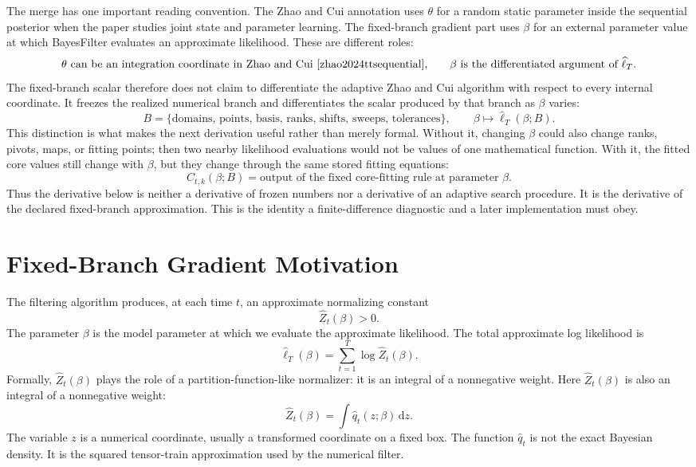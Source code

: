 \documentclass[11pt]{article}
\newcommand{\dd}{\,\mathrm d}
\newcommand{\widehatell}{\widehat\ell}
\begin{document}
The merge has one important reading convention.  The Zhao and Cui \cite{zhao2024ttsequential} annotation uses
\(\theta\) for a random static parameter inside the sequential posterior when
the paper studies joint state and parameter learning.  The fixed-branch
gradient part uses \(\beta\) for an external parameter value at which
BayesFilter evaluates an approximate likelihood.  These are different roles:
\[
    \theta \text{ can be an integration coordinate in Zhao and Cui \cite{zhao2024ttsequential},}
    \qquad
    \beta \text{ is the differentiated argument of } \widehat\ell_T .
    \label{eq:p24-p20-b1}
\]
The fixed-branch scalar therefore does not claim to differentiate the adaptive
Zhao and Cui \cite{zhao2024ttsequential} algorithm with respect to every internal coordinate.  It freezes the
realized numerical branch and differentiates the scalar produced by that
branch as \(\beta\) varies:
\[
    B=\{\text{domains, points, basis, ranks, shifts, sweeps, tolerances}\},
    \qquad
    \beta\mapsto \widehat\ell_T(\beta;B).
    \label{eq:p24-p20-b2}
\]
This distinction is what makes the next derivation useful rather than merely
formal.  Without it, changing \(\beta\) could also change ranks, pivots, maps,
or fitting points; then two nearby likelihood evaluations would not be values
of one mathematical function.  With it, the fitted core values still change
with \(\beta\), but they change through the same stored fitting equations:
\[
    C_{t,k}(\beta;B)
    =
    \text{output of the fixed core-fitting rule at parameter }\beta.
    \label{eq:p24-p20-b3}
\]
Thus the derivative below is neither a derivative of frozen numbers nor a
derivative of an adaptive search procedure.  It is the derivative of the
declared fixed-branch approximation.  This is the identity a finite-difference
diagnostic and a later implementation must obey.

\section{Fixed-Branch Gradient Motivation}

The filtering algorithm produces, at each time \(t\), an approximate
normalizing constant
\[
    \widehat Z_t(\beta)>0.
    \label{eq:p24-p19-1}
\]
The parameter \(\beta\) is the model parameter at which we evaluate the
approximate likelihood.  The total approximate log likelihood is
\[
    \widehatell_T(\beta)
    =
    \sum_{t=1}^{T}\log \widehat Z_t(\beta).
    \label{eq:p24-p19-2}
\]
Formally, \(\widehat Z_t(\beta)\) plays the role of a
partition-function-like normalizer: it is an integral of a nonnegative weight.
Here
\(\widehat Z_t(\beta)\) is also an integral of a nonnegative weight:
\[
    \widehat Z_t(\beta)
    =
    \int \widehat q_t(z;\beta)\dd z.
    \label{eq:p24-p19-3}
\]
The variable \(z\) is a numerical coordinate, usually a transformed coordinate
on a fixed box.  The function \(\widehat q_t\) is not the exact Bayesian
density.  It is the squared tensor-train approximation used by the numerical
filter.
\end{document}
